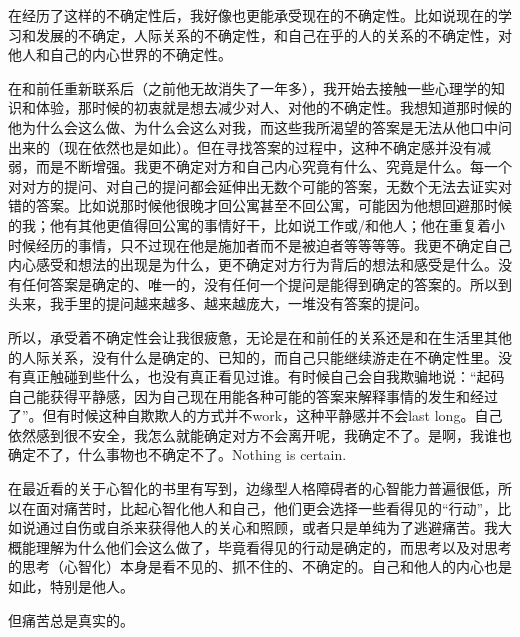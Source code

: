 在经历了这样的不确定性后，我好像也更能承受现在的不确定性。比如说现在的学习和发展的不确定，人际关系的不确定性，和自己在乎的人的关系的不确定性，对他人和自己的内心世界的不确定性。

在和前任重新联系后（之前他无故消失了一年多），我开始去接触一些心理学的知识和体验，那时候的初衷就是想去减少对人、对他的不确定性。我想知道那时候的他为什么会这么做、为什么会这么对我，而这些我所渴望的答案是无法从他口中问出来的（现在依然也是如此）。但在寻找答案的过程中，这种不确定感并没有减弱，而是不断增强。我更不确定对方和自己内心究竟有什么、究竟是什么。每一个对对方的提问、对自己的提问都会延伸出无数个可能的答案，无数个无法去证实对错的答案。比如说那时候他很晚才回公寓甚至不回公寓，可能因为他想回避那时候的我；他有其他更值得回公寓的事情好干，比如说工作或/和他人；他在重复着小时候经历的事情，只不过现在他是施加者而不是被迫者等等等等。我更不确定自己内心感受和想法的出现是为什么，更不确定对方行为背后的想法和感受是什么。没有任何答案是确定的、唯一的，没有任何一个提问是能得到确定的答案的。所以到头来，我手里的提问越来越多、越来越庞大，一堆没有答案的提问。

所以，承受着不确定性会让我很疲惫，无论是在和前任的关系还是和在生活里其他的人际关系，没有什么是确定的、已知的，而自己只能继续游走在不确定性里。没有真正触碰到些什么，也没有真正看见过谁。有时候自己会自我欺骗地说：“起码自己能获得平静感，因为自己现在用能各种可能的答案来解释事情的发生和经过了”。但有时候这种自欺欺人的方式并不work，这种平静感并不会last long。自己依然感到很不安全，我怎么就能确定对方不会离开呢，我确定不了。是啊，我谁也确定不了，什么事物也不确定不了。Nothing is certain.

在最近看的关于心智化的书里有写到，边缘型人格障碍者的心智能力普遍很低，所以在面对痛苦时，比起心智化他人和自己，他们更会选择一些看得见的“行动”，比如说通过自伤或自杀来获得他人的关心和照顾，或者只是单纯为了逃避痛苦。我大概能理解为什么他们会这么做了，毕竟看得见的行动是确定的，而思考以及对思考的思考（心智化）本身是看不见的、抓不住的、不确定的。自己和他人的内心也是如此，特别是他人。

但痛苦总是真实的。

